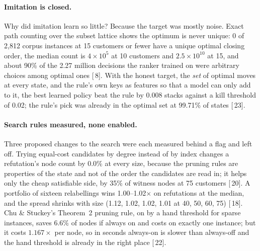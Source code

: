\documentclass[11pt,a4paper]{article}
\renewcommand{\S}[1]{[\textsection\,#1]}
\begin{document}
\paragraph{Imitation is closed.}
Why did imitation learn so little? Because the target was mostly noise. Exact
path counting over the subset lattice shows the optimum is never unique: 0 of
2,812 corpus instances at 15 customers or fewer have a unique optimal closing
order, the median count is $4 \times 10^5$ at 10 customers and
$2.5 \times 10^{10}$ at 15, and about 90\% of the 2.27 million decisions the
ranker trained on were arbitrary choices among optimal ones \S{8}. With the
honest target, the \emph{set} of optimal moves at every state, and the rule's
own keys as features so that a model can only add to it, the best learned
policy beat the rule by 0.008 stacks against a kill threshold of 0.02; the
rule's pick was already in the optimal set at 99.71\% of states \S{23}.

\paragraph{Search rules measured, none enabled.}
Three proposed changes to the search were each measured behind a flag and
left off. Trying equal-cost candidates by degree instead of by index changes a
refutation's node count by 0.0\% at every size, because the pruning rules are
properties of the state and not of the order the candidates are read in; it
helps only the cheap satisfiable side, by 35\% of witness nodes at 75
customers \S{20}. A portfolio of sixteen relabellings wins 1.00--1.02$\times$
on refutations at the median, and the spread shrinks with size (1.12, 1.02,
1.02, 1.01 at 40, 50, 60, 75) \S{18}. Chu \& Stuckey's Theorem~2 pruning
rule, on by a hand threshold for sparse instances, saves 6.6\% of nodes if
always on and costs on exactly one instance; but it costs $1.167\times$ per
node, so in seconds always-on is slower than always-off and the hand threshold
is already in the right place \S{22}.
\end{document}
